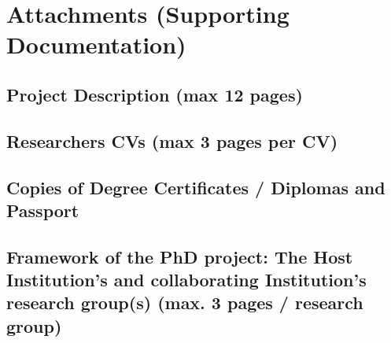 \documentclass[11pt,twoside,a4paper]{article}
\begin{document}
\section{Attachments (Supporting Documentation)}

\subsection{Project Description (max 12 pages)}





\subsection{Researchers CVs (max 3 pages per CV)}



\subsection{Copies of Degree Certificates / Diplomas and Passport}


\subsection{Framework of the PhD project: The Host Institution's and
  collaborating Institution's research group(s) (max. 3 pages / research group)}
\end{document}

